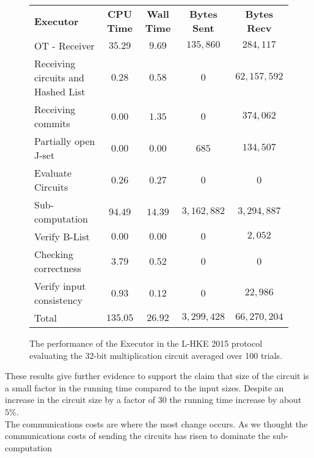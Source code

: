 \documentclass[ %
                    author={Nicholas Tutte},
                supervisor={Prof. Nigel Smart},
                    degree={MEng},
                     title={Secure Two Party Computation},
                  subtitle={A practical comparison of recent protocols},
                      type={Research - GG1K},
                      year={2015} ]{dissertation}
\begin{document}
				\begin{figure}[!ht]
					\begin{tabular}{| p{4.3cm} | c c c c |}
						\hline
						\textbf{Executor} & \textbf{CPU Time} & \textbf{Wall Time} & \textbf{Bytes Sent} & \textbf{Bytes Recv} \\
						\thickhline
						OT - Receiver & $35.29$ & $9.69$ & $135,860$ & $284,117$ \\
						\hline
						Receiving circuits and Hashed List & $0.28$ & $0.58$ & $0$ & $62,157,592$ \\
						\hline
						Receiving commits & $0.00$ & $1.35$ & $0$ & $374,062$ \\
						\hline
						Partially open J-set & $0.00$ & $0.00$ & $685$ & $134,507$ \\
						\hline
						Evaluate Circuits & $0.26$ & $0.27$ & $0$ & $0$ \\
						\hline
						Sub-computation & $94.49$ & $14.39$ & $3,162,882$ & $3,294,887$ \\
						\hline
						Verify B-List & $0.00$ & $0.00$ & $0$ & $2,052$ \\
						\hline
						Checking correctness & $3.79$ & $0.52$ & $0$ & $0$ \\
						\hline
						Verify input consistency & $0.93$ & $0.12$ & $0$ & $22,986$ \\
						\thickhline
						Total & $135.05$ & $26.92$ & $3,299,428$ & $66,270,204$ \\
						\hline
					\end{tabular}
					\caption{The performance of the Executor in the L-HKE 2015 protocol evaluating the 32-bit multiplication circuit averaged over 100 trials. \label{table:L-HKE_2015_Mul_Executor}}
				\end{figure}
				\FloatBarrier

				These results give further evidence to support the claim that size of the circuit is a small factor in the running time compared to the input sizes. Despite an increase in the circuit size by a factor of $30$ the running time increase by about $5\%$.\\

				The communications costs are where the most change occurs. As we thought the communications costs of sending the circuits has risen to dominate the sub-computation
\end{document}
